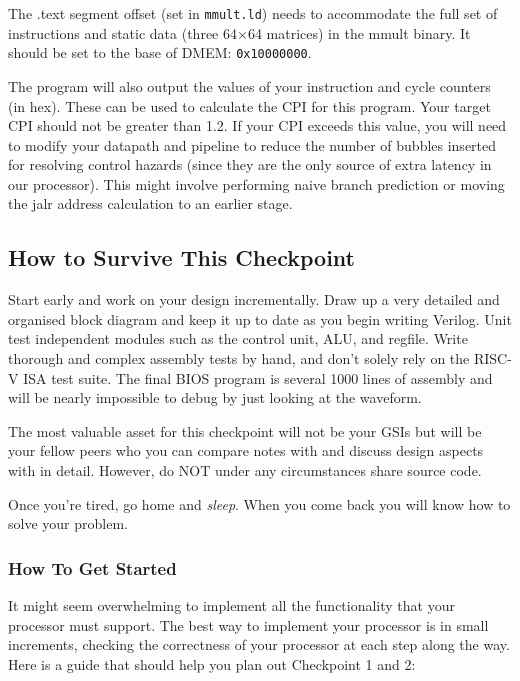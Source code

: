 \documentclass[11pt]{article}
\begin{document}
The .text segment offset (set in \verb|mmult.ld|) needs to accommodate the full set of instructions and static data (three 64$\times$64 matrices) in the mmult binary.
It should be set to the base of DMEM: \verb|0x10000000|.

The program will also output the values of your instruction and cycle counters (in hex).
These can be used to calculate the CPI for this program.
Your target CPI should not be greater than 1.2.
If your CPI exceeds this value, you will need to modify your datapath and pipeline to reduce the number of bubbles inserted for resolving control hazards (since they are the only source of extra latency in our processor).
This might involve performing naive branch prediction or moving the jalr address calculation to an earlier stage.

\subsection{How to Survive This Checkpoint}
Start early and work on your design incrementally.
Draw up a very detailed and organised block diagram and keep it up to date as you begin writing Verilog.
Unit test independent modules such as the control unit, ALU, and regfile.
Write thorough and complex assembly tests by hand, and don't solely rely on the RISC-V ISA test suite.
The final BIOS program is several 1000 lines of assembly and will be nearly impossible to debug by just looking at the waveform.

The most valuable asset for this checkpoint will not be your GSIs but will be your fellow peers who you can compare notes with and discuss design aspects with in detail.
However, do NOT under any circumstances share source code.

Once you're tired, go home and \textit{sleep}. When you come back you will know how to solve your problem.

\subsubsection{How To Get Started}
It might seem overwhelming to implement all the functionality that your processor must support. The best way to implement your processor is in small increments, checking the correctness of your processor at each step along the way. Here is a guide that should help you plan out Checkpoint 1 and 2:
\end{document}
